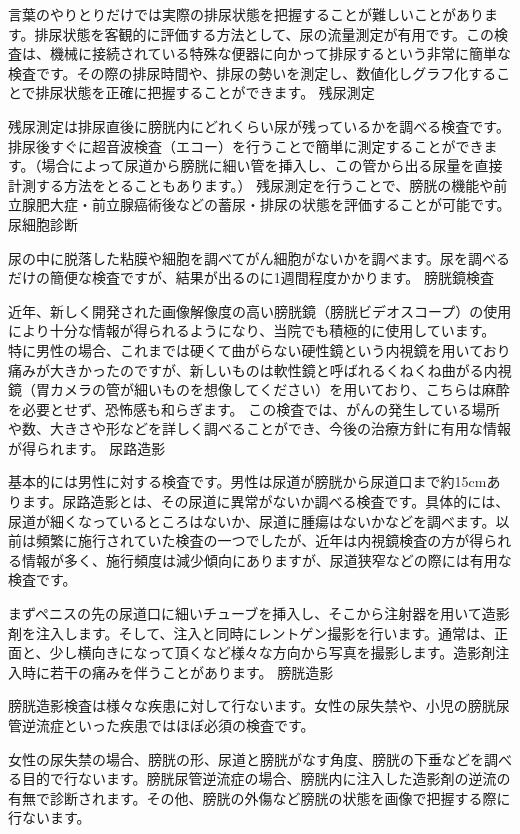     言葉のやりとりだけでは実際の排尿状態を把握することが難しいことがあります。排尿状態を客観的に評価する方法として、尿の流量測定が有用です。この検査は、機械に接続されている特殊な便器に向かって排尿するという非常に簡単な検査です。その際の排尿時間や、排尿の勢いを測定し、数値化しグラフ化することで排尿状態を正確に把握することができます。
残尿測定

    残尿測定は排尿直後に膀胱内にどれくらい尿が残っているかを調べる検査です。
    排尿後すぐに超音波検査（エコー）を行うことで簡単に測定することができます。（場合によって尿道から膀胱に細い管を挿入し、この管から出る尿量を直接計測する方法をとることもあります。）
    残尿測定を行うことで、膀胱の機能や前立腺肥大症・前立腺癌術後などの蓄尿・排尿の状態を評価することが可能です。
尿細胞診断

    尿の中に脱落した粘膜や細胞を調べてがん細胞がないかを調べます。尿を調べるだけの簡便な検査ですが、結果が出るのに1週間程度かかります。
膀胱鏡検査

    近年、新しく開発された画像解像度の高い膀胱鏡（膀胱ビデオスコープ）の使用により十分な情報が得られるようになり、当院でも積極的に使用しています。
    特に男性の場合、これまでは硬くて曲がらない硬性鏡という内視鏡を用いており痛みが大きかったのですが、新しいものは軟性鏡と呼ばれるくねくね曲がる内視鏡（胃カメラの管が細いものを想像してください）を用いており、こちらは麻酔を必要とせず、恐怖感も和らぎます。
    この検査では、がんの発生している場所や数、大きさや形などを詳しく調べることができ、今後の治療方針に有用な情報が得られます。
尿路造影

    基本的には男性に対する検査です。男性は尿道が膀胱から尿道口まで約15cmあります。尿路造影とは、その尿道に異常がないか調べる検査です。具体的には、尿道が細くなっているところはないか、尿道に腫瘍はないかなどを調べます。以前は頻繁に施行されていた検査の一つでしたが、近年は内視鏡検査の方が得られる情報が多く、施行頻度は減少傾向にありますが、尿道狭窄などの際には有用な検査です。

    まずペニスの先の尿道口に細いチューブを挿入し、そこから注射器を用いて造影剤を注入します。そして、注入と同時にレントゲン撮影を行います。通常は、正面と、少し横向きになって頂くなど様々な方向から写真を撮影します。造影剤注入時に若干の痛みを伴うことがあります。
膀胱造影

    膀胱造影検査は様々な疾患に対して行ないます。女性の尿失禁や、小児の膀胱尿管逆流症といった疾患ではほぼ必須の検査です。

    女性の尿失禁の場合、膀胱の形、尿道と膀胱がなす角度、膀胱の下垂などを調べる目的で行ないます。膀胱尿管逆流症の場合、膀胱内に注入した造影剤の逆流の有無で診断されます。その他、膀胱の外傷など膀胱の状態を画像で把握する際に行ないます。

